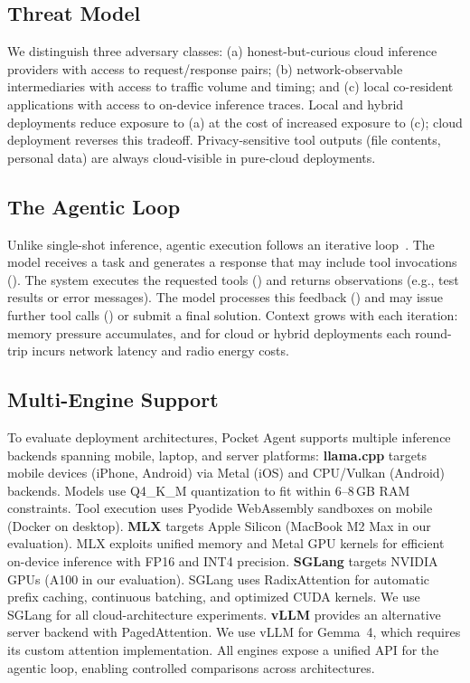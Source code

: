 \documentclass[sigconf,anonymous,review]{acmart}
\begin{document}
\subsection{Threat Model}

We distinguish three adversary classes: (a) honest-but-curious cloud inference providers with access to request/response pairs; (b) network-observable intermediaries with access to traffic volume and timing; and (c) local co-resident applications with access to on-device inference traces. Local and hybrid deployments reduce exposure to (a) at the cost of increased exposure to (c); cloud deployment reverses this tradeoff. Privacy-sensitive tool outputs (file contents, personal data) are always cloud-visible in pure-cloud deployments.

\subsection{The Agentic Loop}

Unlike single-shot inference, agentic execution follows an iterative loop~\cite{madaan2023selfrefine}.
The model receives a task and generates a response that may include tool invocations ().
The system executes the requested tools () and returns observations (e.g., test results or error messages).
The model processes this feedback () and may issue further tool calls () or submit a final solution.
Context grows with each iteration: memory pressure accumulates, and for cloud or hybrid deployments each round-trip incurs network latency and radio energy costs.

\subsection{Multi-Engine Support}

To evaluate deployment architectures, Pocket Agent supports multiple inference backends spanning mobile, laptop, and server platforms:
\textbf{llama.cpp} targets mobile devices (iPhone, Android) via Metal (iOS) and CPU/Vulkan (Android) backends. Models use Q4\_K\_M quantization to fit within 6--8\,GB RAM constraints. Tool execution uses Pyodide WebAssembly sandboxes on mobile (Docker on desktop).
\textbf{MLX} targets Apple Silicon (MacBook M2 Max in our evaluation). MLX exploits unified memory and Metal GPU kernels for efficient on-device inference with FP16 and INT4 precision.
\textbf{SGLang} targets NVIDIA GPUs (A100 in our evaluation). SGLang uses RadixAttention for automatic prefix caching, continuous batching, and optimized CUDA kernels. We use SGLang for all cloud-architecture experiments.
\textbf{vLLM} provides an alternative server backend with PagedAttention. We use vLLM for Gemma~4, which requires its custom attention implementation.
All engines expose a unified API for the agentic loop, enabling controlled comparisons across architectures.
\end{document}
